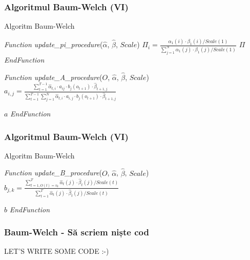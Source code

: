 \begin{frame}[fragile, t]
	\frametitle{Algoritmul Baum-Welch (VI)}	
	\begin{algorithm}[H]
		\scriptsize
      	\caption{Algoritm Baum-Welch}
      	\label{alg-baum-welch}
      	 
      	\begin{algorithmic}[1]
      		\STATE \emph{Function update\_pi\_procedure}($\hat{\alpha}$, $\hat{\beta}$, $Scale$)
					\STATE $\Pi_i = \frac{\alpha_1(i) \cdot \beta_1(i) / Scale(1)}
										{\sum_{j=1}^{N}{\alpha_1(j) \cdot \beta_1(j) / Scale(1)}}$
				\ENDFOR
				\RETURN $\Pi$
      		\STATE \emph{EndFunction}
			
			\vspace*{0.5em} 
      		\STATE \emph{Function update\_A\_procedure}($O$, $\hat{\alpha}$, $\hat{\beta}$, $Scale$)
					\STATE $a_{i,j} = \frac{\sum_{t=1}^{T-1}{\hat{\alpha}_{t,i}\cdot a_{ij} \cdot b_j(o_{t+1}) 
												\cdot \hat{\beta}_{t+1,j}}}
										{\sum_{t=1}^{T-1}\sum_{j=1}^{N}{\hat{\alpha}_{t,i}\cdot a_{i,j} 
										\cdot b_j(o_{t+1}) \cdot \hat{\beta}_{t+1,j}}}$
					\ENDFOR
				\ENDFOR
				
				\RETURN $a$
      		\STATE \emph{EndFunction}
		\end{algorithmic}
	\end{algorithm}  
\end{frame}


\begin{frame}[fragile]
	\frametitle{Algoritmul Baum-Welch (VI)}	
	\begin{algorithm}[H]
		\scriptsize
      	\caption{Algoritm Baum-Welch}
      	\label{alg-baum-welch}
      	 
      	\begin{algorithmic}[1]
      		\STATE \emph{Function update\_B\_procedure}($O$, $\hat{\alpha}$, $\hat{\beta}$, $Scale$)
					\STATE $b_{j,k} = \frac{\sum_{t=1,O(t)=v_k}^{T}
											{\hat{\alpha}_t(j) \cdot \hat{\beta}_t(j) / Scale(t)}}
										   {\sum_{t=1}^{T}
											{\hat{\alpha}_t(j) \cdot \hat{\beta}_t(j) / Scale(t)}}$
					\ENDFOR
				\ENDFOR
				
				\RETURN $b$
      		\STATE \emph{EndFunction}
		\end{algorithmic}
	\end{algorithm}  
\end{frame}


\begin{frame}
	\frametitle{Baum-Welch - Să scriem niște cod}
	\centering
	LET'S WRITE SOME CODE :-)
\end{frame}